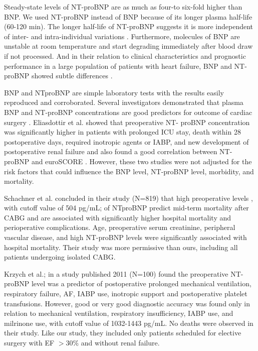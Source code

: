 \documentclass[14pt,a4paper,onecolumn]{extarticle}
\begin{document}
Steady-state levels of NT-proBNP are as much as four-to six-fold higher than BNP. We used NT-proBNP instead of BNP because of its longer plasma half-life (60-120 min). The longer half-life of NT-proBNP suggests it is more independent of inter- and intra-individual variations \citep{Clerico2006}. Furthermore, molecules of BNP are unstable at room temperature and start degrading immediately after blood draw if not processed. And in their relation to clinical characteristics and prognostic performance in a large population of patients with heart failure, BNP and NT-proBNP showed subtle differences \citep{Masson2006}.

BNP and NTproBNP are simple laboratory tests with the results easily reproduced and corroborated. Several investigators demonstrated that plasma BNP and NT-proBNP concentrations are good predictors for outcome of cardiac surgery \citep{Hutfless2004}. Eliasdottir et al. showed that preoperative NT- proBNP concentration was significantly higher in patients with prolonged ICU stay, death within 28 postoperative days, required inotropic agents or IABP, and new development of postoperative renal failure and also found a good correlation between NT-proBNP and euroSCORE \citep{Eliasdottir2008}.  However, these two studies were not adjusted for the risk factors that could influence the BNP level, NT-proBNP level, morbidity, and mortality.

Schachner et al. concluded in their study (N=819) that high preoperative levels , with cutoff value of 504 pg/mL; of NTproBNP predict mid-term mortality after CABG and are associated with significantly higher hospital mortality and perioperative complications.  Age, preoperative serum creatinine, peripheral vascular disease, and high NT-proBNP levels were significantly associated with hospital mortality.  Their study was more permissive than ours, including all patients undergoing isolated CABG. \citep{Schachner2010}

Krzych et al.; in a study published 2011 (N=100) found the preoperative NT-proBNP level was a predictor of postoperative prolonged mechanical ventilation, respiratory failure, AF, IABP use, inotropic support and postoperative platelet transfusions. However, good or very good diagnostic accuracy was found only in relation to mechanical ventilation, respiratory insufficiency, IABP use, and milrinone use, with cutoff value of 1032-1443 pg/mL. No deaths were observed in their study. \citep{Krzych2011}  Like our study, they included only patients scheduled for elective surgery with EF $> 30\%$ and without renal failure.
\end{document}
